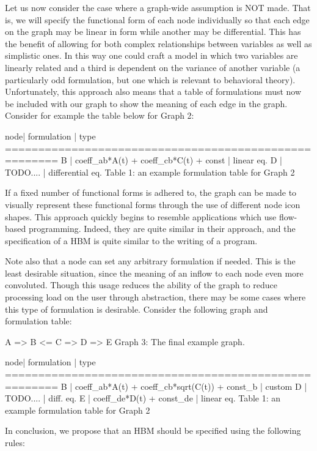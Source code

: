 Let us now consider the case where a graph-wide assumption is NOT made.
That is, we will specify the functional form of each node individually so that each edge on the graph may be linear in form while another may be differential.
This has the benefit of allowing for both complex relationships between variables as well as simplistic ones.
In this way one could craft a model in which two variables are linearly related and a third is dependent on the variance of another variable (a particularly odd formulation, but one which is relevant to behavioral theory).
Unfortunately, this approach also means that a table of formulations must now be included with our graph to show the meaning of each edge in the graph.
Consider for example the table below for Graph 2:

node| formulation                              |    type
======================================================
B   | coeff_ab*A(t) + coeff_cb*C(t) + const     |  linear eq.
D   |      TODO....                             | differential eq.
Table 1: an example formulation table for Graph 2 

If a fixed number of functional forms is adhered to, the graph can be made to visually represent these functional forms through the use of different node icon shapes. 
This approach quickly begins to resemble applications which use flow-based programming. 
Indeed, they are quite similar in their approach, and the specification of a HBM is quite similar to the writing of a program.

Note also that a node can set any arbitrary formulation if needed. 
This is the least desirable situation, since the meaning of an inflow to each node even more convoluted. 
Though this usage reduces the ability of the graph to reduce processing load on the user through abstraction, there may be some cases where this type of formulation is desirable. 
Consider the following graph and formulation table:

A => B <= C => D => E
Graph 3: The final example graph.


node|      formulation                              | type
======================================================
B   | coeff_ab*A(t) + coeff_cb*sqrt(C(t)) + const_b |  custom
D   |      TODO....                                 | diff. eq.
E   | coeff_de*D(t) + const_de                      | linear eq.
Table 1: an example formulation table for Graph 2 


In conclusion, we propose that an HBM should be specified using the following rules:

